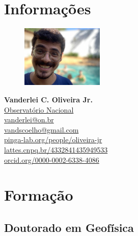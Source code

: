 \section*{Informações}

\begin{figure} 
	\centering
	\includegraphics[width=0.35\textwidth]{foto}
\end{figure}

{\Large \faUser} \textbf{Vanderlei C. Oliveira Jr.}\\
{\Large \faInstitution} \href{https://www.on.br/index.php/pt-br/}{Observatório Nacional}\\
{\Large \faEnvelope} \href{mailto:vanderlei@on.br}{vanderlei@on.br}\\
{\Large \faEnvelopeO} \href{mailto:vandscoelho@gmail.com}{vandscoelho@gmail.com}\\
{\Large \faGroup} \href{http://www.pinga-lab.org/people/oliveira-jr.html}{pinga-lab.org/people/oliveira-jr}\\
{\Large \faInfoCircle} \href{http://lattes.cnpq.br/4332841435949533}{lattes.cnpq.br/4332841435949533}\\
{\Large \faInfoCircle} \href{http://orcid.org/0000-0002-6338-4086}{orcid.org/0000-0002-6338-4086}\\


\section*{Formação}

\subsection*{Doutorado em Geof{\'i}sica}

